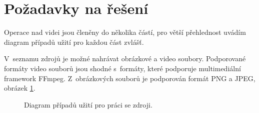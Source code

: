 \section{Požadavky na řešení}
Operace nad videi jsou členěny do několika částí, pro větší přehlednost uvádím diagram případů užití pro každou část zvlášť.

V~seznamu zdrojů je možné nahrávat obrázkové a video soubory. Podporované formáty video souborů jsou shodné s~formáty, které podporuje multimediální framework FFmpeg. Z~obrázkových souborů je podporován formát PNG a JPEG, obrázek \ref{img:ucd-zdroj}.
\begin{figure}[h]
	\centering
	\caption{Diagram případů užití pro práci se zdroji.}\label{img:ucd-zdroj}
\end{figure}

